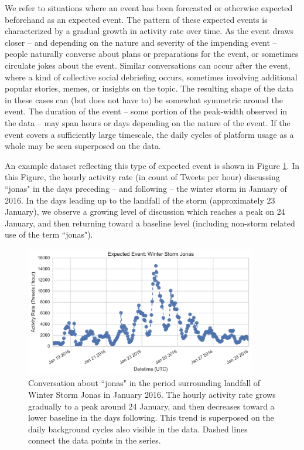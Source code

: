 \documentclass{article}
\begin{document}
We refer to situations where an event has been forecasted or otherwise expected beforehand as an expected event. The pattern of these expected events is characterized by a gradual growth in activity rate over time. As the event draws closer -- and depending on the nature and severity of the impending event -- people naturally converse about plans or preparations for the event, or sometimes circulate jokes about the event. Similar conversations can occur after the event, where a kind of collective social debriefing occurs, sometimes involving additional popular stories, memes, or insights on the topic. The resulting shape of the data in these cases can (but does not have to) be somewhat symmetric around the event. The duration of the event -- some portion of the peak-width observed in the data -- may span hours or days depending on the nature of the event. If the event covers a sufficiently large timescale, the daily cycles of platform usage as a whole may be seen superposed on the data. 

An example dataset reflecting this type of expected event is shown in Figure \ref{fig:jonas}. In this Figure, the hourly activity rate (in count of Tweets per hour) discussing ``jonas" in the days preceding -- and following -- the winter storm in January of 2016. In the days leading up to the landfall of the storm (approximately 23 January), we observe a growing level of discussion which reaches a peak on 24 January, and then returning toward a baseline level (including non-storm related use of the term ``jonas"). 

\begin{figure}[!b]
\centering
\includegraphics[width=0.9\textwidth]{img/jonas.png}
\caption{Conversation about ``jonas" in the period surrounding landfall of Winter Storm Jonas in January 2016. The hourly activity rate grows gradually to a peak around 24 January, and then decreases toward a lower baseline in the days following. This trend is superposed on the daily background cycles also visible in the data. Dashed lines connect the data points in the series.}
\label{fig:jonas}
\end{figure}
\end{document}
